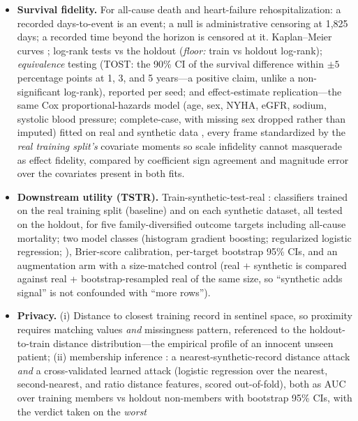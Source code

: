 \documentclass[11pt,a4paper]{article}
\begin{document}
\begin{itemize}
rows). \emph{Floor:} the holdout's own values.
\item \textbf{Survival fidelity.} For all-cause death and heart-failure
rehospitalization: a recorded days-to-event is an event; a null is administrative
censoring at 1{,}825 days; a recorded time beyond the horizon is censored at it.
Kaplan--Meier curves \citep{kaplan1958nonparametric}; log-rank tests
\citep{mantel1966evaluation} vs the holdout (\emph{floor:} train vs holdout
log-rank); \emph{equivalence} testing (TOST: the 90\% CI of the survival
difference within $\pm 5$ percentage points at 1, 3, and 5 years---a positive
claim, unlike a non-significant log-rank), reported per seed; and effect-estimate
replication---the same Cox proportional-hazards model \citep{cox1972regression}
(age, sex, NYHA, eGFR, sodium, systolic blood pressure; complete-case, with
missing sex dropped rather than imputed) fitted on real and synthetic data
\citep{davidsonpilon2019lifelines}, every frame standardized by the \emph{real
training split's} covariate moments so scale infidelity cannot masquerade as
effect fidelity, compared by coefficient sign agreement and magnitude error over
the covariates present in both fits.
\item \textbf{Downstream utility (TSTR).} Train-synthetic-test-real
\citep{esteban2017realvalued}: classifiers trained on the real training split
(baseline) and on each synthetic dataset, all tested on the holdout, for five
family-diversified outcome targets including all-cause mortality; two model
classes (histogram gradient boosting; regularized logistic regression;
\citealp{pedregosa2011scikit}), Brier-score calibration, per-target bootstrap 95\%
CIs, and an augmentation arm with a size-matched control (real + synthetic is
compared against real + bootstrap-resampled real of the same size, so ``synthetic
adds signal'' is not confounded with ``more rows'').
\item \textbf{Privacy.} (i) Distance to closest training record
\citep[Gower-style mixed distance;][]{gower1971general} in sentinel space, so
proximity requires matching values \emph{and} missingness pattern, referenced to
the holdout-to-train distance distribution---the empirical profile of an innocent
unseen patient; (ii) membership inference \citep{shokri2017membership}: a
nearest-synthetic-record distance attack \emph{and} a cross-validated learned
attack (logistic regression over the nearest, second-nearest, and ratio distance
features, scored out-of-fold), both as AUC over training members vs holdout
non-members with bootstrap 95\% CIs, with the verdict taken on the \emph{worst}

\end{itemize}
\end{document}
